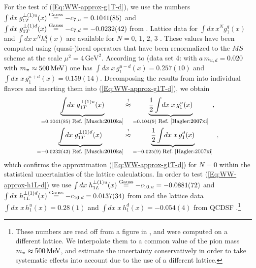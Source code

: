\documentclass[a4paper,11pt]{article}
\newcommand{\ba}{\begin{eqnarray}}
\newcommand{\ea}{\end{eqnarray}}
\newcommand{\Gaussian}{\ensuremath{\stackrel{\text{\scriptsize Gauss}}{=}}}
\begin{document}
For the test of (\ref{Eq:WW-approx-g1T-d}), we use the numbers
$\int d x\;g_{1T}^{\perp(1)u}(x)\Gaussian
-c_{7,u}= 0.1041(85)$ and
$\int d x\;g_{1T}^{\perp(1)d}(x)\Gaussian
-c_{7,d}=-0.0232(42)$
from \cite{Musch:2010ka}. %
Lattice data for
$\int d x \,x^{N}g_1^q(x)$
\cite{Hagler:2003is,Hagler:2007xi} and
$\int d x \,x^{N}h_1^q(x)$
\cite{Gockeler:2005cj} are available for $N=0,\,1,\,2,\,3$ .
These values have been computed using (quasi-)local operators that
have been renormalized to the $\overline{MS}$ scheme at the scale
$\mu^2 = 4\,\text{GeV}^2$.
According to \cite{Hagler:2007xi} (data set 4:
with $a\,m_{u,d} = 0.020$ with $m_\pi\approx 500\,{\rm MeV}$)
one has $\int d x \;x\,g_1^{u-d}(x)= 0.257(10)$ and
$\int d x \;x\,g_1^{u+d}(x)= 0.159(14)$.
Decomposing the results from  \cite{Hagler:2007xi} into
individual flavors and inserting them into (\ref{Eq:WW-approx-g1T-d}), we obtain
\ba
        \underbrace{\int \! d x\;g_{1T}^{\perp(1)u}(x)}
        _{= 0.1041(85) \;\mbox{\footnotesize Ref.~\cite{Musch:2010ka}}}
        &\stackrel{!}{\approx}
        \underbrace{\frac{1}{2}\int \! d x\;x\,g_1^u(x)}
        _{= 0.104(9) \;\mbox{\footnotesize Ref.~\cite{Hagler:2007xi}}}
        \hspace{2mm} , \nonumber \\
        \underbrace{\int \! d x\;g_{1T}^{\perp(1)d}(x)}
        _{= -0.0232(42) \;\mbox{\footnotesize Ref.~\cite{Musch:2010ka}}}
        &\stackrel{!}{\approx}
        \underbrace{\frac{1}{2}\int \!d x\;x\,g_1^d(x)}
        _{= -0.025(9) \;\mbox{\footnotesize Ref.~\cite{Hagler:2007xi}}}
        \hspace{2mm},
        \label{Eq:test-WW-type-lattice-g1T}
\ea
which confirms the approximation (\ref{Eq:WW-approx-g1T-d}) for $N=0$
within the statistical uncertainties of the lattice calculations.
%
In order to test (\ref{Eq:WW-approx-h1L-d}) we use
$\int dx\;h_{1L}^{\perp(1)u}(x)\Gaussian -c_{10,u}=-0.0881(72)$
and
$\int dx\;h_{1L}^{\perp(1)d}(x)\Gaussian -c_{10,d}=0.0137(34)$
from \cite{Musch:2010ka} and the lattice data
$\int d x \;x\,h_1^u(x)= 0.28(1)$ and
$\int d x \;x\,h_1^d(x)= -0.054(4)$
from QCDSF \cite{Gockeler:2005cj}.\footnote{
  These numbers are read off from a figure in \cite{Gockeler:2005cj},
  and were computed on a different lattice. We interpolate them to a
  common value of the pion mass $m_\pi\approx500\,{\rm MeV}$, and
  estimate the uncertainty conservatively in order to take systematic effects
  into account due to the use of a different lattice.}
\end{document}
